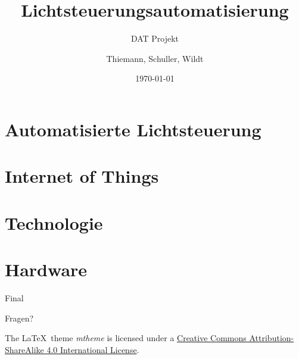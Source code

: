 \documentclass[10pt, compress]{beamer}
\title{Lichtsteuerungsautomatisierung}
\subtitle{DAT Projekt}
\date{\today}
\author{Thiemann, Schuller, Wildt}
\institute{Hochschule Rosenheim}
\begin{document}
\maketitle

\section{Automatisierte Lichtsteuerung}


\section{Internet of Things}

\section{Technologie}

\section{Hardware}

\begin{frame}{Final}

  \begin{center}\huge Fragen?\end{center}
    
  \vspace{1cm}
  \begin{center}
  {\small

  The \LaTeX \ theme \emph{mtheme} is licensed under a
  \href{http://creativecommons.org/licenses/by-sa/4.0/}{Creative Commons
  Attribution-ShareAlike 4.0 International License}.}

  \ccbysa
  
  \end{center}

\end{frame}
\end{document}
